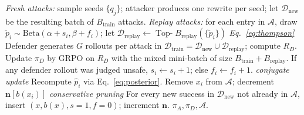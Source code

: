 \documentclass{article}
\newcommand{\piA}{\pi_A}
\newcommand{\piD}{\pi_D}
\newcommand{\archive}{\mathcal{A}}
\begin{document}
\begin{algorithm}[h]
\begin{algorithmic}[1]
        \STATE \textit{Fresh attacks:} sample seeds $\{q_j\}$; attacker produces one rewrite per seed; let $\mathcal{D}_{\mathrm{new}}$ be the resulting batch of $B_{\mathrm{train}}$ attacks.
        \STATE \textit{Replay attacks:} for each entry in $\archive$, draw $\tilde p_i \sim \mathrm{Beta}(\alpha+s_i,\beta+f_i)$; let $\mathcal{D}_{\mathrm{replay}}\leftarrow \operatorname{Top-}B_{\mathrm{replay}}(\{\tilde p_i\})$ \hfill\textit{Eq.~\ref{eq:thompson}}
        \STATE Defender generates $G$ rollouts per attack in $\mathcal{D}_{\mathrm{train}}\!=\!\mathcal{D}_{\mathrm{new}}\cup\mathcal{D}_{\mathrm{replay}}$; compute $R_D$.
        \STATE Update $\piD$ by GRPO on $R_D$ with the mixed mini-batch of size $B_{\mathrm{train}}+B_{\mathrm{replay}}$.
          \STATE If any defender rollout was judged unsafe, $s_i\leftarrow s_i+1$; else $f_i\leftarrow f_i+1$. \hfill\textit{conjugate update}
          \STATE Recompute $\hat p_i$ via Eq.~\ref{eq:posterior}.
            \STATE Remove $x_i$ from $\archive$; decrement $\mathbf{n}[b(x_i)]$ \hfill\textit{conservative pruning}
          \ENDIF
        \ENDFOR
        \STATE For every new success in $\mathcal{D}_{\mathrm{new}}$ not already in $\archive$, insert $(x, b(x), s{=}1, f{=}0)$; increment $\mathbf{n}$.
      \ENDFOR
    \ENDFOR
    \RETURN $\piA, \piD, \archive$.
  \end{algorithmic}
\end{algorithm}
\end{document}
